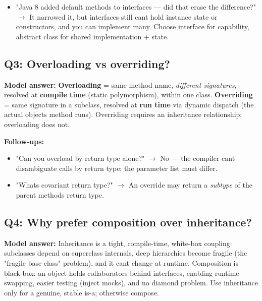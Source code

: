 \documentclass[11pt]{article}
\providecommand{\tightlist}{\setlength{\itemsep}{1pt}\setlength{\parskip}{0pt}}
\begin{document}
\begin{itemize}
\tightlist
\item
  "Java 8 added default methods to interfaces --- did that erase the difference?" \(\rightarrow\) It narrowed it, but interfaces still can\textquotesingle t hold instance state or constructors, and you can implement many. Choose interface for capability, abstract class for shared implementation + state.
\end{itemize}

\subsection{Q3: Overloading vs overriding?}\label{q3-overloading-vs-overriding}

\textbf{Model answer:} \textbf{Overloading} = same method name, \emph{different signatures}, resolved at \textbf{compile time} (static polymorphism), within one class. \textbf{Overriding} = same signature in a subclass, resolved at \textbf{run time} via dynamic dispatch (the actual object\textquotesingle s method runs). Overriding requires an inheritance relationship; overloading does not.

\textbf{Follow-ups:}

\begin{itemize}
\tightlist
\item
  "Can you overload by return type alone?" \(\rightarrow\) No --- the compiler can\textquotesingle t disambiguate calls by return type; the parameter list must differ.
\item
  "What\textquotesingle s covariant return type?" \(\rightarrow\) An override may return a \emph{subtype} of the parent method\textquotesingle s return type.
\end{itemize}

\subsection{Q4: Why prefer composition over inheritance?}\label{q4-why-prefer-composition-over-inheritance}

\textbf{Model answer:} Inheritance is a tight, compile-time, white-box coupling: subclasses depend on superclass internals, deep hierarchies become fragile (the "fragile base class" problem), and it can\textquotesingle t change at runtime. Composition is black-box: an object holds collaborators behind interfaces, enabling runtime swapping, easier testing (inject mocks), and no diamond problem. Use inheritance only for a genuine, stable is-a; otherwise compose.
\end{document}
